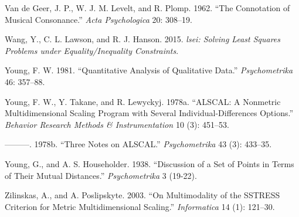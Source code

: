 \documentclass[
  12pt,
  letterpaper,
  DIV=11,
  numbers=noendperiod]{scrreprt}
\newlength{\cslhangindent}
\newenvironment{CSLReferences}[2] %
 {\begin{list}{}{%
  \setlength{\itemindent}{0pt}
  \setlength{\leftmargin}{0pt}
  \setlength{\parsep}{0pt}
  \ifodd #1
   \setlength{\leftmargin}{\cslhangindent}
   \setlength{\itemindent}{-1\cslhangindent}
  \fi
  \setlength{\itemsep}{#2\baselineskip}}}
 {\end{list}}
\theoremstyle{remark}
\begin{document}
\begin{CSLReferences}{1}{0}
Van de Geer, J. P., W. J. M. Levelt, and R. Plomp. 1962. {``{The
Connotation of Musical Consonance}.''} \emph{Acta Psychologica} 20:
308--19.

Wang, Y., C. L. Lawson, and R. J. Hanson. 2015. \emph{{lsei: Solving
Least Squares Problems under Equality/Inequality Constraints}}.

Young, F. W. 1981. {``{Quantitative Analysis of Qualitative Data}.''}
\emph{Psychometrika} 46: 357--88.

Young, F. W., Y. Takane, and R. Lewyckyj. 1978a. {``{ALSCAL: A Nonmetric
Multidimensional Scaling Program with Several Individual-Differences
Options}.''} \emph{Behavior Research Methods \& Instrumentation} 10 (3):
451--53.

---------. 1978b. {``{Three Notes on ALSCAL}.''} \emph{Psychometrika} 43
(3): 433--35.

Young, G., and A. S. Householder. 1938. {``{Discussion of a Set of
Points in Terms of Their Mutual Distances}.''} \emph{Psychometrika} 3
(19-22).

Zilinskas, A., and A. Poslipskyte. 2003. {``{On Multimodality of the
SSTRESS Criterion for Metric Multidimensional Scaling}.''}
\emph{Informatica} 14 (1): 121--30.

\end{CSLReferences}
\end{document}
